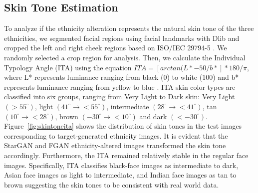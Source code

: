 {\subsection{Skin Tone Estimation}
To analyze if the ethnicity alteration represents the natural skin tone of the three ethnicities, we segmented facial regions using facial landmarks with Dlib and cropped the left and right cheek regions based on ISO/IEC 29794-5 \cite{ISO2023}. We randomly selected a crop region for analysis. Then, we calculate the Individual Typology Angle (ITA) \cite{ITA1991} using the equation  $ITA=[arctan(L*-50/b*]*180/\pi$, where L* represents luminance ranging from black (0) to white (100) and b* represents luminance ranging from yellow to blue \cite{ITA1991}. ITA skin color types are classified into six groups, ranging from Very Light to Dark skin: Very Light $(>55^{\circ})$, light  $(41^{\circ}  \to <55^{\circ})$, intermediate $(28^{\circ} \to  <41^{\circ})$, tan $(10^{\circ} \to  <28^{\circ})$, brown $(-30^{\circ} \to  <10^{\circ})$ and dark $(<-30^{\circ})$. Figure~\ref{fig:skintoneita} shows the distribution of skin tones in the test images corresponding to target-generated ethnicity images. It is evident that the StarGAN and FGAN ethnicity-altered images transformed the skin tone accordingly. Furthermore, the ITA remained relatively stable in the regular face images. Specifically, ITA classifies black-face images as intermediate to dark, Asian face images as light to intermediate, and Indian face images as tan to brown suggesting the skin tones to be consistent with real world data.

}
